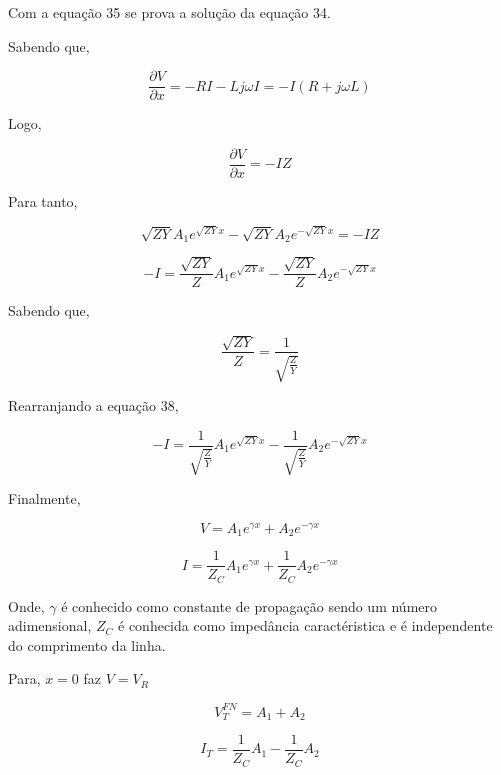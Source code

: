\documentclass[a4paper, 10pt]{article}
\begin{document}
Com a equação 35 se prova a solução da equação 34.

Sabendo que,

\begin{equation}
\frac{\partial V}{\partial x} = - R I - L j \omega I = -I (R + j \omega L)
\end{equation}

Logo,

$$
\frac{\partial V}{\partial x} = - I Z
$$

Para tanto,

\begin{equation}
\sqrt{Z Y} A_1 e^{\sqrt{Z Y} x} - \sqrt{Z Y} A_2 e^{-\sqrt{Z Y} x} = - I Z
\end{equation}

\begin{equation}
-I = \frac{\sqrt{Z Y}}{Z} A_1 e^{\sqrt{Z Y} x} - \frac{\sqrt{Z Y}}{Z} A_2 e^{-\sqrt{Z Y} x} 
\end{equation}

Sabendo que,

\begin{equation}
\frac{\sqrt{Z Y}}{Z} = \frac{1}{\sqrt{\frac{Z}{Y}}}
\end{equation}

Rearranjando a equação 38,

\begin{equation}
-I = \frac{1}{\sqrt{\frac{Z}{Y}}} A_1 e^{\sqrt{Z Y} x} - \frac{1}{\sqrt{\frac{Z}{Y}}} A_2 e^{-\sqrt{Z Y} x} 
\end{equation}

Finalmente,

\begin{equation}
V = A_1 e^{\gamma x} +   A_2 e^{- \gamma x}
\end{equation}

\begin{equation}
I = \frac{1}{Z_C} A_1 e^{\gamma x} +  \frac{1}{Z_C} A_2 e^{- \gamma x}
\end{equation}

Onde, $\gamma$ é conhecido como constante de propagação sendo um número
adimensional, $Z_C$ é conhecida como impedância caractéristica e é 
independente do comprimento da linha.

Para, $x=0$ faz $V=V_R$

\begin{equation}
V_T^{FN} = A_1 + A_2
\end{equation}

\begin{equation}
I_T = \frac{1}{Z_C} A_1 - \frac{1}{Z_C} A_2
\end{equation}
\end{document}

